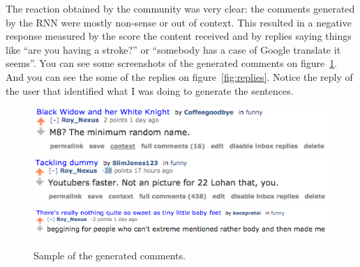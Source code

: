 \documentclass{article} %
\begin{document}
The reaction obtained by the community was very clear: the comments generated by
the RNN were mostly non-sense or out of context. This resulted in a negative
response measured by the score the content received and by replies saying things
like ``are you having a stroke?'' or ``somebody has a case of Google translate
it seems''. You can see some screenshots of the generated comments on
figure~\ref{fig:comments}.
And you can see the some of the replies on figure~\ref{fig:replies}. Notice the
reply of the user that identified what I was doing to generate the sentences.

\begin{figure}[h]
\centering
\includegraphics[scale=0.5]{comment2}
\includegraphics[scale=0.5]{comment3}
\includegraphics[scale=0.5]{comment1}
\caption{Sample of the generated comments.}
\label{fig:comments}
\end{figure}
\end{document}
